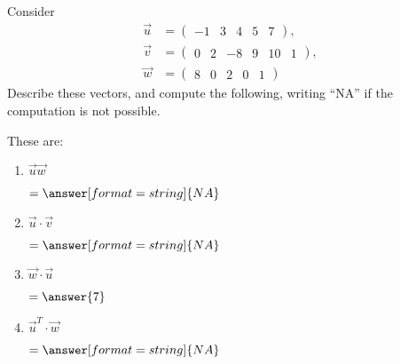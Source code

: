 \documentclass{ximera}
\begin{document}
\begin{exercise}

  Consider
  \begin{align*}
    \vec{u} &= \begin{pmatrix} -1 & 3 & 4 & 5 & 7
    \end{pmatrix},\\
    \vec{v} &= \begin{pmatrix}
      0 & 2 & -8 & 9 & 10 & 1
    \end{pmatrix},\\
    \vec{w} &= \begin{pmatrix}
      8 & 0 & 2 & 0 & 1
    \end{pmatrix}
  \end{align*}
  Describe these vectors, and compute the following, writing ``NA'' if the
  computation is not possible.
  \begin{prompt}These are:
    \begin{multipleChoice}
    \end{multipleChoice}
  \end{prompt}
  \begin{enumerate}
    \item $\vec{u}\vec{w}$ \begin{prompt} $= \answer[format=string]{NA}$\end{prompt}
    \item $\vec{u} \cdot \vec{v}$ \begin{prompt} $= \answer[format=string]{NA}$\end{prompt}
    \item $\vec{w} \cdot \vec{u}$ \begin{prompt} $= \answer{7}$\end{prompt}
    \item $\vec{u}^{T} \cdot \vec{w}$ \begin{prompt} $= \answer[format=string]{NA}$\end{prompt}
  \end{enumerate}
\end{exercise}
\end{document}
